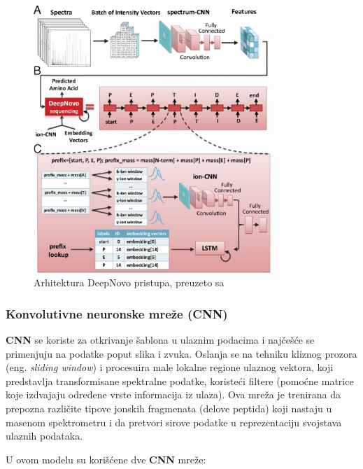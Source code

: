 \documentclass[12pt,oneside]{memoir}
\begin{document}
\begin{figure}[h]
\centering
\includegraphics[width=0.8\textwidth]{images/deep_novo_architecture.jpeg}
\caption{Arhitektura DeepNovo pristupa, preuzeto sa \cite{deepnovo}}
\label{fig:arhitektura}
\end{figure}

\subsubsection{Konvolutivne neuronske mreže (CNN)}
\textbf{CNN} se koriste za otkrivanje šablona u ulaznim podacima i najčešće se primenjuju na podatke poput slika i zvuka. Oslanja se na tehniku kliznog prozora (eng. \emph{sliding window}) i procesuira male lokalne regione ulaznog vektora, koji predstavlja transformisane spektralne podatke, koristeći filtere (pomoćne matrice koje izdvajaju određene vrste informacija iz ulaza). Ova mreža je trenirana da prepozna različite tipove jonskih fragmenata (delove peptida) koji nastaju u masenom spektrometru i da pretvori sirove podatke u reprezentaciju svojstava ulaznih podataka.

U ovom modelu su korišćene dve \textbf{CNN} mreže:
\end{document}
